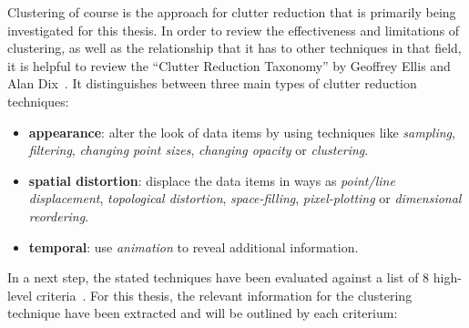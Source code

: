 Clustering of course is the approach for clutter reduction that is primarily being investigated for this thesis. In order to review the effectiveness and limitations of clustering, as well as the relationship that it has to other techniques in that field, it is helpful to review the ``Clutter Reduction Taxonomy'' by Geoffrey Ellis and Alan Dix~\cite{ellis08clutter}. It distinguishes between three main types of clutter reduction techniques:

\begin{itemize}

\item \textbf{appearance}: alter the look of data items by using techniques like \textit{sampling}, \textit{filtering}, \textit{changing point sizes}, \textit{changing opacity} or \textit{clustering}.

\item \textbf{spatial distortion}: displace the data items in ways as \textit{point/line displacement}, \textit{topological distortion}, \textit{space-filling}, \textit{pixel-plotting} or \textit{dimensional reordering}.

\item \textbf{temporal}: use \textit{animation} to reveal additional information.

\end{itemize}

In a next step, the stated techniques have been evaluated against a list of 8 high-level criteria~\cite{ellis08clutter}. For this thesis, the relevant information for the clustering technique have been extracted and will be outlined by each criterium:

